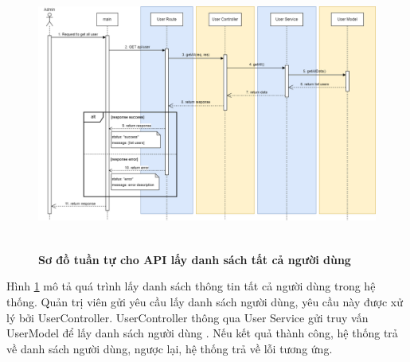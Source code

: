 \begin{figure}[H]
  \centering
  \includegraphics[width=16cm,height=9cm]{Images/sequence_api/getAllUsers.png}
  \caption[Sơ đồ tuần tự cho API lấy danh sách tất cả người dùng ]{\bfseries \fontsize{12pt}{0pt}
  \selectfont Sơ đồ tuần tự cho API lấy danh sách tất cả người dùng }
  \label{api_getAllUser} %
\end{figure}
Hình \ref{api_getAllUser} mô tả quá trình lấy danh sách thông tin tất cả người dùng trong hệ thống. Quản trị viên gửi yêu cầu lấy danh sách người dùng, yêu cầu này được xử lý bởi UserController. UserController thông qua User Service gửi truy vấn UserModel để lấy danh sách người dùng . 
Nếu kết quả thành công, hệ thống trả về danh sách người dùng, ngược lại, hệ thống trả về lỗi tương ứng.

